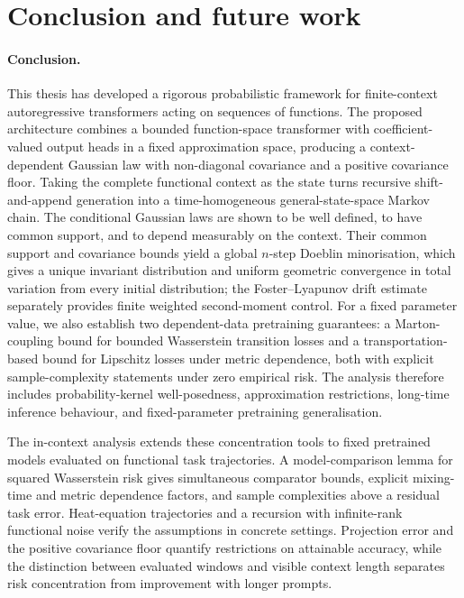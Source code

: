 \section{Conclusion and future work}\label{sec:Conclusion and future work}

\paragraph{Conclusion.}
This thesis has developed a rigorous probabilistic framework for finite-context autoregressive transformers acting on sequences of functions. The proposed architecture combines a bounded function-space transformer with coefficient-valued output heads in a fixed approximation space, producing a context-dependent Gaussian law with non-diagonal covariance and a positive covariance floor. Taking the complete functional context as the state turns recursive shift-and-append generation into a time-homogeneous general-state-space Markov chain. The conditional Gaussian laws are shown to be well defined, to have common support, and to depend measurably on the context. Their common support and covariance bounds yield a global \(n\)-step Doeblin minorisation, which gives a unique invariant distribution and uniform geometric convergence in total variation from every initial distribution; the Foster--Lyapunov drift estimate separately provides finite weighted second-moment control. For a fixed parameter value, we also establish two dependent-data pretraining guarantees: a Marton-coupling bound for bounded Wasserstein transition losses and a transportation-based bound for Lipschitz losses under metric dependence, both with explicit sample-complexity statements under zero empirical risk. The analysis therefore includes probability-kernel well-posedness, approximation restrictions, long-time inference behaviour, and fixed-parameter pretraining generalisation.

The in-context analysis extends these concentration tools to fixed pretrained models evaluated on functional task trajectories. A model-comparison lemma for squared Wasserstein risk gives simultaneous comparator bounds, explicit mixing-time and metric dependence factors, and sample complexities above a residual task error. Heat-equation trajectories and a recursion with infinite-rank functional noise verify the assumptions in concrete settings. Projection error and the positive covariance floor quantify restrictions on attainable accuracy, while the distinction between evaluated windows and visible context length separates risk concentration from improvement with longer prompts.

